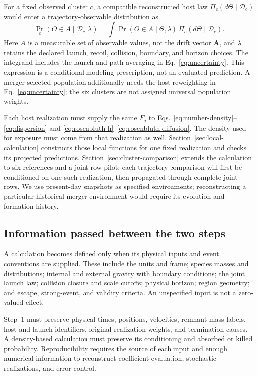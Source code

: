 \documentclass[aps,prd,reprint,amsmath,amssymb,superscriptaddress,nofootinbib,longbibliography,floatfix]{revtex4-2}
\begin{document}
For a fixed observed cluster $c$, a compatible reconstructed host law $\Pi_c(d\Theta\mid\mathcal D_c)$ would enter a trajectory-observable distribution as
\begin{equation}
\Pr_c(O\in A\mid\mathcal D_c,\lambda)
=\int\Pr(O\in A\mid\Theta,\lambda)\,
\Pi_c(d\Theta\mid\mathcal D_c).
\label{eq:observational-propagation}
\end{equation}
Here $A$ is a measurable set of observable values, not the drift vector $\mathbf A$, and $\lambda$ retains the declared launch, recoil, collision, boundary, and horizon choices. The integrand includes the launch and path averaging in Eq.~\eqref{eq:uncertainty}. This expression is a conditional modeling prescription, not an evaluated prediction. A merger-selected population additionally needs the host reweighting in Eq.~\eqref{eq:uncertainty}; the six clusters are not assigned universal population weights.

Each host realization must supply the same $F_j$ to Eqs.~\eqref{eq:number-density}--\eqref{eq:dispersion} and \eqref{eq:rosenbluth-h}--\eqref{eq:rosenbluth-diffusion}. The density used for exposure must come from that realization as well. Section~\ref{sec:local-calculation} constructs those local functions for one fixed realization and checks its projected predictions. Section~\ref{sec:cluster-comparison} extends the calculation to six references and a joint-row pilot; each trajectory comparison will first be conditioned on one such realization, then propagated through complete joint rows. We use present-day snapshots as specified environments; reconstructing a particular historical merger environment would require its evolution and formation history.

\subsection{Information passed between the two steps}

A calculation becomes defined only when its physical inputs and event conventions are supplied. These include the units and frame; species masses and distributions; internal and external gravity with boundary conditions; the joint launch law; collision closure and scale cutoffs; physical horizon; region geometry; and escape, strong-event, and validity criteria. An unspecified input is not a zero-valued effect.

Step~1 must preserve physical times, positions, velocities, remnant-mass labels, host and launch identifiers, original realization weights, and termination causes. A density-based calculation must preserve its conditioning and absorbed or killed probability. Reproducibility requires the source of each input and enough numerical information to reconstruct coefficient evaluation, stochastic realizations, and error control.
\end{document}
